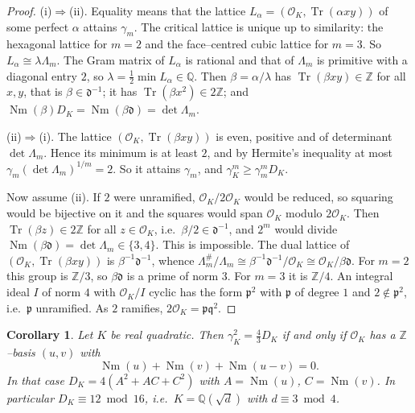 \documentclass[11pt,reqno]{amsart}
\theoremstyle{plain}
\newtheorem{corollary}[theorem]{Corollary}
\theoremstyle{definition}
\newcommand{\Z}{\mathbb{Z}}
\newcommand{\Q}{\mathbb{Q}}
\newcommand{\Nm}{\operatorname{Nm}}
\newcommand{\Tr}{\operatorname{Tr}}
\begin{document}
\begin{proof}
(i)$\Rightarrow$(ii). Equality means that the lattice $L_\alpha=(\mathcal O_K,\Tr(\alpha xy))$ of some
perfect $\alpha$ attains $\gamma_m$. The critical lattice is unique up to similarity: the hexagonal lattice
for $m=2$ and the face--centred cubic lattice for $m=3$. So $L_\alpha\cong\lambda\Lambda_m$. The Gram matrix
of $L_\alpha$ is rational and that of $\Lambda_m$ is primitive with a diagonal entry $2$, so
$\lambda=\tfrac12\min L_\alpha\in\Q$. Then $\beta=\alpha/\lambda$ has $\Tr(\beta xy)\in\Z$ for all $x,y$, that
is $\beta\in\mathfrak d^{-1}$; it has $\Tr(\beta x^2)\in2\Z$; and $\Nm(\beta)D_K=\Nm(\beta\mathfrak d)=\det\Lambda_m$.

(ii)$\Rightarrow$(i). The lattice $(\mathcal O_K,\Tr(\beta xy))$ is even, positive and of determinant
$\det\Lambda_m$. Hence its minimum is at least $2$, and by Hermite's inequality at most
$\gamma_m(\det\Lambda_m)^{1/m}=2$. So it attains $\gamma_m$, and $\gamma_K^m\ge\gamma_m^mD_K$.

Now assume (ii). If $2$ were unramified, $\mathcal O_K/2\mathcal O_K$ would be reduced, so squaring would be
bijective on it and the squares would span $\mathcal O_K$ modulo $2\mathcal O_K$. Then $\Tr(\beta z)\in2\Z$
for all $z\in\mathcal O_K$, i.e.\ $\beta/2\in\mathfrak d^{-1}$, and $2^m$ would divide
$\Nm(\beta\mathfrak d)=\det\Lambda_m\in\{3,4\}$. This is impossible. The dual lattice of
$(\mathcal O_K,\Tr(\beta xy))$ is $\beta^{-1}\mathfrak d^{-1}$, whence
$\Lambda_m^\#/\Lambda_m\cong\beta^{-1}\mathfrak d^{-1}/\mathcal O_K\cong\mathcal O_K/\beta\mathfrak d$. For
$m=2$ this group is $\Z/3$, so $\beta\mathfrak d$ is a prime of norm $3$. For $m=3$ it is $\Z/4$. An integral
ideal $I$ of norm $4$ with $\mathcal O_K/I$ cyclic has the form $\mathfrak p^2$ with $\mathfrak p$ of degree
$1$ and $2\notin\mathfrak p^2$, i.e.\ $\mathfrak p$ unramified. As $2$ ramifies, $2\mathcal O_K=\mathfrak p\mathfrak q^2$.
\end{proof}

\begin{corollary}\label{cor:leibak2}
Let $K$ be real quadratic. Then $\gamma_K^2=\tfrac43D_K$ if and only if $\mathcal O_K$ has a $\Z$--basis
$(u,v)$ with
\[
\Nm(u)+\Nm(v)+\Nm(u-v)=0 .
\]
In that case $D_K=4(A^2+AC+C^2)$ with $A=\Nm(u)$, $C=\Nm(v)$. In particular $D_K\equiv12\bmod16$, i.e.\
$K=\Q(\sqrt d)$ with $d\equiv3\bmod4$.
\end{corollary}
\end{document}
